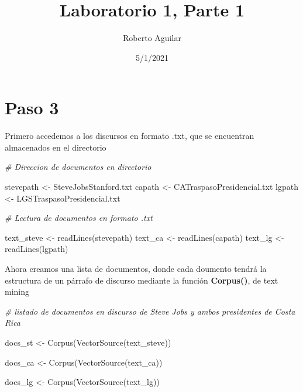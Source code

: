 \documentclass[
]{article}
\title{Laboratorio 1, Parte 1}
\author{Roberto Aguilar}
\date{5/1/2021}
\newenvironment{Shaded}{\begin{snugshade}}{\end{snugshade}}
\newcommand{\CommentTok}[1]{\textcolor[rgb]{0.56,0.35,0.01}{\textit{#1}}}
\newcommand{\FunctionTok}[1]{\textcolor[rgb]{0.00,0.00,0.00}{#1}}
\newcommand{\NormalTok}[1]{#1}
\newcommand{\OtherTok}[1]{\textcolor[rgb]{0.56,0.35,0.01}{#1}}
\newcommand{\StringTok}[1]{\textcolor[rgb]{0.31,0.60,0.02}{#1}}
\begin{document}
\maketitle

\hypertarget{paso-3}{%
\section{Paso 3}\label{paso-3}}

Primero accedemos a los discursos en formato .txt, que se encuentran
almacenados en el directorio

\begin{Shaded}
\begin{Highlighting}[]
\CommentTok{\# Direccion de documentos en directorio}

\NormalTok{stevepath }\OtherTok{\textless{}{-}} \StringTok{\textquotesingle{}SteveJobsStanford.txt\textquotesingle{}}
\NormalTok{capath }\OtherTok{\textless{}{-}} \StringTok{\textquotesingle{}CATraspasoPresidencial.txt\textquotesingle{}}
\NormalTok{lgpath }\OtherTok{\textless{}{-}} \StringTok{\textquotesingle{}LGSTraspasoPresidencial.txt\textquotesingle{}}

\CommentTok{\# Lectura de documentos en formato .txt}

\NormalTok{text\_steve }\OtherTok{\textless{}{-}} \FunctionTok{readLines}\NormalTok{(stevepath)}
\NormalTok{text\_ca }\OtherTok{\textless{}{-}} \FunctionTok{readLines}\NormalTok{(capath)}
\NormalTok{text\_lg }\OtherTok{\textless{}{-}} \FunctionTok{readLines}\NormalTok{(lgpath)}
\end{Highlighting}
\end{Shaded}

Ahora creamos una lista de documentos, donde cada doumento tendrá la
estructura de un párrafo de discurso mediante la función
\textbf{Corpus()}, de text mining

\begin{Shaded}
\begin{Highlighting}[]
\CommentTok{\# listado de documentos en discurso de Steve Jobs y ambos presidentes de Costa Rica}

\NormalTok{docs\_st }\OtherTok{\textless{}{-}} \FunctionTok{Corpus}\NormalTok{(}\FunctionTok{VectorSource}\NormalTok{(text\_steve))}

\NormalTok{docs\_ca }\OtherTok{\textless{}{-}} \FunctionTok{Corpus}\NormalTok{(}\FunctionTok{VectorSource}\NormalTok{(text\_ca))}

\NormalTok{docs\_lg }\OtherTok{\textless{}{-}} \FunctionTok{Corpus}\NormalTok{(}\FunctionTok{VectorSource}\NormalTok{(text\_lg))}
\end{Highlighting}
\end{Shaded}
\end{document}
